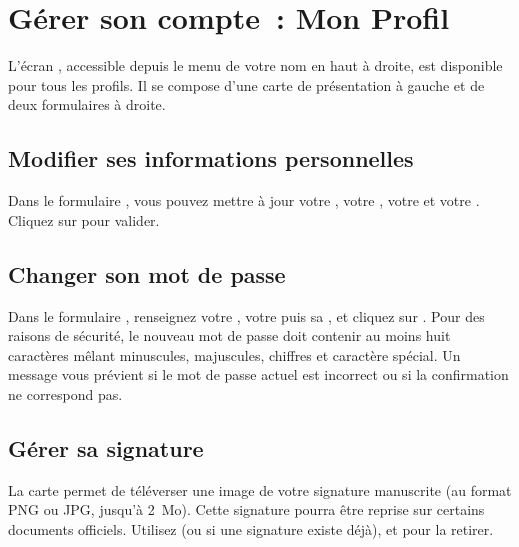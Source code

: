 \section{Gérer son compte~: Mon Profil}

L'écran , accessible depuis le menu de votre nom en haut à droite, est disponible pour tous les profils. Il se compose d'une carte de présentation à gauche et de deux formulaires à droite.

\subsection{Modifier ses informations personnelles}

Dans le formulaire , vous pouvez mettre à jour votre , votre , votre  et votre . Cliquez sur  pour valider.


\subsection{Changer son mot de passe}

Dans le formulaire , renseignez votre , votre  puis sa , et cliquez sur . Pour des raisons de sécurité, le nouveau mot de passe doit contenir au moins huit caractères mêlant minuscules, majuscules, chiffres et caractère spécial. Un message vous prévient si le mot de passe actuel est incorrect ou si la confirmation ne correspond pas.

\subsection{Gérer sa signature}

La carte  permet de téléverser une image de votre signature manuscrite (au format PNG ou JPG, jusqu'à 2~Mo). Cette signature pourra être reprise sur certains documents officiels. Utilisez  (ou  si une signature existe déjà), et  pour la retirer.


